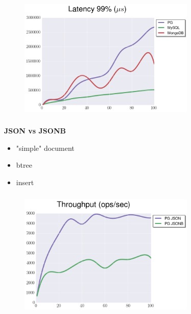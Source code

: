 \documentclass[usenames,dvipsnames, 18pt, compress, aspectratio=169]{beamer}
\begin{document}
\begin{frame}
    \frametitle{}
    \begin{center}
    \begin{figure}
        \includegraphics[width=0.75\textwidth,center]{benchmarks/update_btree_large_latency.png}
    \end{figure}
    \end{center}
\end{frame}

\begin{frame}
    \frametitle{}
    \begin{center}
        \textbf{JSON vs JSONB}
        \begin{itemize}[label={}]
            \item "simple" document
            \item btree
            \item insert
        \end{itemize}
    \end{center}
\end{frame}

\begin{frame}
    \frametitle{}
    \begin{center}
    \begin{figure}
        \includegraphics[width=0.75\textwidth,center]{benchmarks/postgresql_load_json_jsonb.png}
    \end{figure}
    \end{center}
\end{frame}
\end{document}
